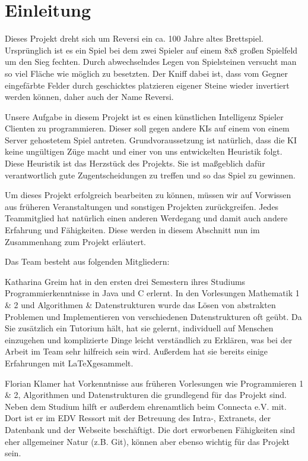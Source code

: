 \documentclass[12pt,a4paper,bibliography=totocnumbered,listof=totocnumbered]{scrartcl}
\begin{document}
\section{Einleitung}


Dieses Projekt dreht sich um Reversi ein ca. 100 Jahre altes Brettspiel. Ursprünglich ist es ein Spiel bei dem zwei Spieler auf einem 8x8 großen Spielfeld um den Sieg fechten. Durch abwechselndes Legen von Spielsteinen versucht man so viel Fläche wie möglich zu besetzten. Der Kniff dabei ist, dass vom Gegner eingefärbte Felder durch geschicktes platzieren eigener Steine wieder invertiert werden können, daher auch der Name Reversi.

Unsere Aufgabe in diesem Projekt ist es einen künstlichen Intelligenz Spieler Clienten zu programmieren. Dieser soll gegen andere KIs auf einem von einem Server gehostetem Spiel antreten. Grundvoraussetzung ist natürlich, dass die KI keine ungültigen Züge macht und einer von uns entwickelten Heuristik folgt. Diese Heuristik ist das Herzstück des Projekts. Sie ist maßgeblich dafür verantwortlich gute Zugentscheidungen zu treffen und so das Spiel zu gewinnen.

Um dieses Projekt erfolgreich bearbeiten zu können, müssen wir auf Vorwissen aus früheren Veranstaltungen und sonstigen Projekten zurückgreifen. Jedes Teammitglied hat natürlich einen anderen Werdegang und damit auch andere Erfahrung und Fähigkeiten. Diese werden in diesem Abschnitt nun im Zusammenhang zum Projekt erläutert.

Das Team besteht aus folgenden Mitgliedern:

Katharina Greim hat in den ersten drei Semestern ihres Studiums Programmierkenntnisse in Java und C erlernt. In den Vorlesungen Mathematik 1 \& 2 und Algorithmen \& Datenstrukturen wurde das Lösen von abstrakten Problemen und Implementieren von verschiedenen Datenstrukturen oft geübt. Da Sie zusätzlich ein Tutorium hält, hat sie gelernt, individuell auf Menschen einzugehen und komplizierte Dinge leicht verständlich zu Erklären, was bei der Arbeit im Team sehr hilfreich sein wird. Außerdem hat sie bereits einige Erfahrungen mit \LaTeX\quad gesammelt. 

Florian Klamer hat Vorkenntnisse aus früheren Vorlesungen wie Programmieren 1 \& 2, Algorithmen und Datenstrukturen die grundlegend für das Projekt sind. Neben dem Studium hilft er außerdem ehrenamtlich beim Connecta e.V. mit. Dort ist er im EDV Ressort mit der Betreuung des Intra-, Extranets, der Datenbank und der Webseite beschäftigt. Die dort erworbenen Fähigkeiten sind eher allgemeiner Natur (z.B. Git), können aber ebenso wichtig für das Projekt sein.
\end{document}

